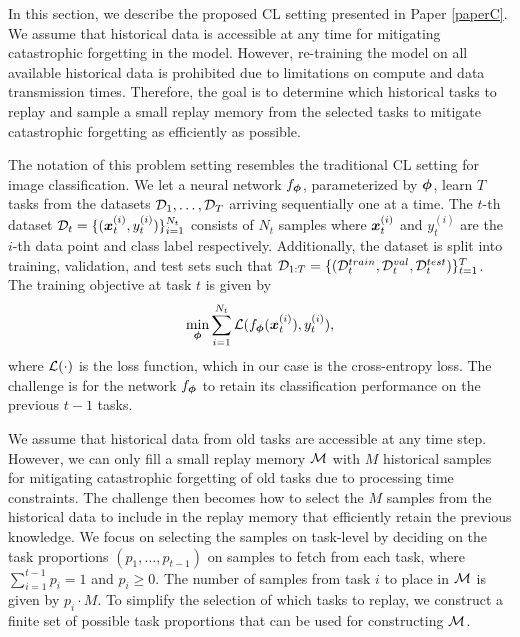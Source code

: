 In this section, we describe the proposed CL setting presented in Paper \ref{paperC}. We assume that historical data is accessible at any time for mitigating catastrophic forgetting in the model. However, re-training the model on all available historical data is prohibited due to limitations on compute and data transmission times. Therefore, the goal is to determine which historical tasks to replay and sample a small replay memory from the selected tasks to mitigate catastrophic forgetting as efficiently as possible. 

The notation of this problem setting resembles the traditional CL setting for image classification. We let a neural network $f_{{\bm{\phi}}}$, parameterized by ${\bm{\phi}}$, learn $T$ tasks from the datasets ${\mathcal{D}}_1, \dots, {\mathcal{D}}_T$ arriving sequentially one at a time. The $t$-th dataset ${\mathcal{D}}_t = \{({\bm{x}}_{t}^{(i)}, y_{t}^{(i)})\}_{i=1}^{N_{t}}$ consists of $N_t$ samples where ${\bm{x}}_{t}^{(i)}$ and $y_{t}^{(i)}$ are the $i$-th data point and class label respectively. Additionally, the dataset is split into training, validation, and test sets such that ${\mathcal{D}}_{1:T} = \{({\mathcal{D}}_{t}^{train}, {\mathcal{D}}_{t}^{val}, {\mathcal{D}}_{t}^{test})\}_{t=1}^{T}$. The training objective at task $t$ is given by 
\begin{align}
	\underset{{\bm{\phi}}}{\text{min}} \sum_{i=1}^{N_t} {\mathcal{L}}(f_{{\bm{\phi}}}({\bm{x}}_t^{(i)}), y_{t}^{(i)}),
\end{align}
where ${\mathcal{L}}(\cdot)$ is the loss function, which in our case is the cross-entropy loss. The challenge is for the network $f_{{\bm{\phi}}}$ to retain its classification performance on the previous $t-1$ tasks. 

We assume that historical data from old tasks are accessible at any time step. However, we can only fill a small replay memory ${\mathcal{M}}$ with $M$ historical samples for mitigating catastrophic forgetting of old tasks due to processing time constraints. The challenge then becomes how to select the $M$ samples from the historical data to include in the replay memory that efficiently retain the previous knowledge. 
We focus on selecting the samples on task-level by deciding on the task proportions $(p_1, \dots, p_{t-1})$ on samples to fetch from each task, where $\sum_{i=1}^{t-1} p_i = 1$ and $p_{i} \geq 0$. The number of samples from task $i$ to place in ${\mathcal{M}}$ is given by $p_i \cdot M$. To simplify the selection of which tasks to replay, we construct a finite set of possible task proportions that can be used for constructing ${\mathcal{M}}$. 

